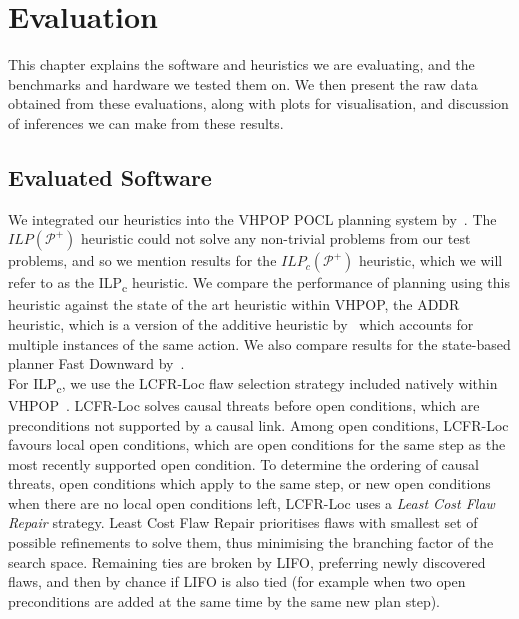 \chapter{Evaluation}\label{chap:evaluation}

This chapter explains the software and heuristics we are evaluating, and the benchmarks and hardware we tested them on. We then present the raw data obtained from these evaluations, along with plots for visualisation, and discussion of inferences we can make from these results.


\section{Evaluated Software}


We integrated our heuristics into the VHPOP POCL planning system by~\cite{Younes2003VHPOPAndAdditiveHeuristic}. The $\mathit{ILP}(\mathcal{P}^+)$ heuristic could not solve any non-trivial problems from our test problems, and so we mention results for the $\mathit{ILP_c}(\mathcal{P}^+)$ heuristic, which we will refer to as the ILP\textsubscript{c} heuristic. We compare the performance of planning using this heuristic against the state of the art heuristic within VHPOP, the ADDR heuristic, which is a version of the additive heuristic by~\cite{Younes2003VHPOPAndAdditiveHeuristic} which accounts for multiple instances of the same action. We also compare results for the state-based planner Fast Downward by~\cite{Helmert2006FastDownward}.\\


For ILP\textsubscript{c}, we use the LCFR-Loc flaw selection strategy included natively within VHPOP~\citep{Younes2003VHPOPAndAdditiveHeuristic}. LCFR-Loc solves causal threats before open conditions, which are preconditions not supported by a causal link. Among open conditions, LCFR-Loc favours local open conditions, which are open conditions for the same step as the most recently supported open condition. To determine the ordering of causal threats, open conditions which apply to the same step, or new open conditions when there are no local open conditions left, LCFR-Loc uses a \textit{Least Cost Flaw Repair} strategy. Least Cost Flaw Repair prioritises flaws with smallest set of possible refinements to solve them, thus minimising the branching factor of the search space. Remaining ties are broken by LIFO, preferring newly discovered flaws, and then by chance if LIFO is also tied (for example when two open preconditions are added at the same time by the same new plan step).\\


